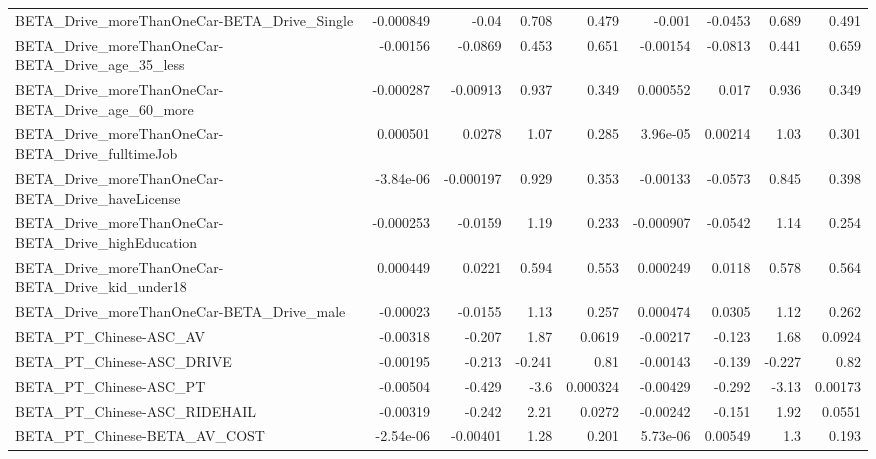 \begin{tabular}{lrrrrrrrr}
BETA\_Drive\_moreThanOneCar-BETA\_Drive\_Single        &   -0.000849 &        -0.04 &    0.708 &    0.479 &     -0.001 &     -0.0453 &        0.689 &         0.491 \\
BETA\_Drive\_moreThanOneCar-BETA\_Drive\_age\_35\_less   &    -0.00156 &      -0.0869 &    0.453 &    0.651 &   -0.00154 &     -0.0813 &        0.441 &         0.659 \\
BETA\_Drive\_moreThanOneCar-BETA\_Drive\_age\_60\_more   &   -0.000287 &     -0.00913 &    0.937 &    0.349 &   0.000552 &       0.017 &        0.936 &         0.349 \\
BETA\_Drive\_moreThanOneCar-BETA\_Drive\_fulltimeJob   &    0.000501 &       0.0278 &     1.07 &    0.285 &   3.96e-05 &     0.00214 &         1.03 &         0.301 \\
BETA\_Drive\_moreThanOneCar-BETA\_Drive\_haveLicense   &   -3.84e-06 &    -0.000197 &    0.929 &    0.353 &   -0.00133 &     -0.0573 &        0.845 &         0.398 \\
BETA\_Drive\_moreThanOneCar-BETA\_Drive\_highEducation &   -0.000253 &      -0.0159 &     1.19 &    0.233 &  -0.000907 &     -0.0542 &         1.14 &         0.254 \\
BETA\_Drive\_moreThanOneCar-BETA\_Drive\_kid\_under18   &    0.000449 &       0.0221 &    0.594 &    0.553 &   0.000249 &      0.0118 &        0.578 &         0.564 \\
BETA\_Drive\_moreThanOneCar-BETA\_Drive\_male          &    -0.00023 &      -0.0155 &     1.13 &    0.257 &   0.000474 &      0.0305 &         1.12 &         0.262 \\
BETA\_PT\_Chinese-ASC\_AV                             &    -0.00318 &       -0.207 &     1.87 &   0.0619 &   -0.00217 &      -0.123 &         1.68 &        0.0924 \\
BETA\_PT\_Chinese-ASC\_DRIVE                          &    -0.00195 &       -0.213 &   -0.241 &     0.81 &   -0.00143 &      -0.139 &       -0.227 &          0.82 \\
BETA\_PT\_Chinese-ASC\_PT                             &    -0.00504 &       -0.429 &     -3.6 & 0.000324 &   -0.00429 &      -0.292 &        -3.13 &       0.00173 \\
BETA\_PT\_Chinese-ASC\_RIDEHAIL                       &    -0.00319 &       -0.242 &     2.21 &   0.0272 &   -0.00242 &      -0.151 &         1.92 &        0.0551 \\
BETA\_PT\_Chinese-BETA\_AV\_COST                       &   -2.54e-06 &     -0.00401 &     1.28 &    0.201 &   5.73e-06 &     0.00549 &          1.3 &         0.193 \\

\end{tabular}
